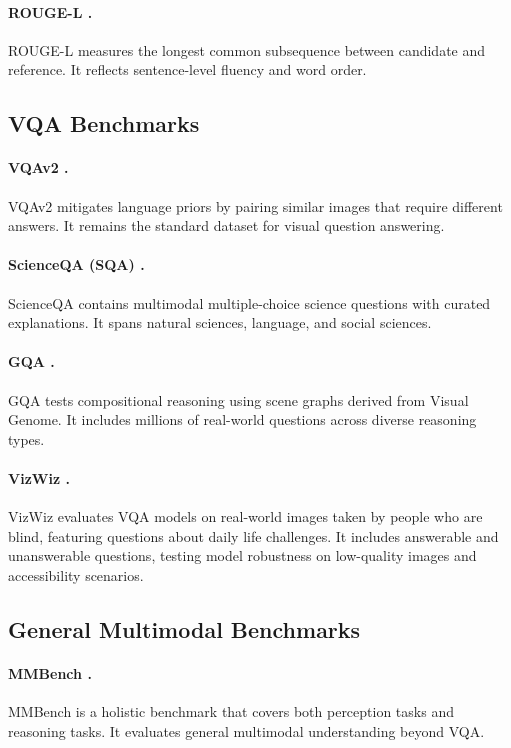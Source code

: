 \documentclass[11pt]{article}
\begin{document}
\paragraph{ROUGE-L \citep{lin2004rouge}.}
ROUGE-L measures the longest common subsequence between candidate and reference. It reflects sentence-level fluency and word order.  



\subsection{VQA Benchmarks}
\paragraph{VQAv2 \citep{goyal2017making}.}
VQAv2 mitigates language priors by pairing similar images that require different answers. It remains the standard dataset for visual question answering.  

\paragraph{ScienceQA (SQA) \citep{lu2022learn}.}
ScienceQA contains multimodal multiple-choice science questions with curated explanations. It spans natural sciences, language, and social sciences.

\paragraph{GQA \citep{hudson2019gqa}.}
GQA tests compositional reasoning using scene graphs derived from Visual Genome. It includes millions of real-world questions across diverse reasoning types.  


\paragraph{VizWiz \citep{gurari2018vizwiz}.}
VizWiz evaluates VQA models on real-world images taken by people who are blind, featuring questions about daily life challenges. It includes answerable and unanswerable questions, testing model robustness on low-quality images and accessibility scenarios.

\subsection{General Multimodal Benchmarks}
\paragraph{MMBench \citep{lu2022learn}.}
MMBench is a holistic benchmark that covers both perception tasks and reasoning tasks. It evaluates general multimodal understanding beyond VQA.
\end{document}
